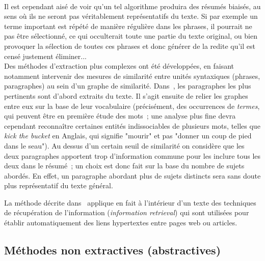 \documentclass[a4paper, 12pt]{article}
\begin{document}
\paragraph{}
Il est cependant aisé de voir qu'un tel algorithme produira des résumés biaisés, au sens où ils ne seront pas véritablement représentatifs du texte. Si par exemple un terme important est répété de manière régulière dans les phrases, il pourrait ne pas être sélectionné, ce qui occulterait toute une partie du texte original, ou bien provoquer la sélection de toutes ces phrases et donc générer de la redite qu'il est censé justement éliminer... \\

Des méthodes d'extraction plus complexes ont été développées, en faisant notamment intervenir des mesures de similarité entre unités syntaxiques (phrases, paragraphes) au sein d'un graphe de similarité. Dans~\cite{salton_automatic_1997}, les paragraphes les plus pertinents sont d'abord extraits du texte. Il s'agit ensuite de relier les graphes entre eux sur la base de leur vocabulaire (précisément, des occurrences de \emph{termes}, qui peuvent être en première étude des mots~; une analyse plus fine devra cependant reconnaître certaines entités indissociables de plusieurs mots, telles que \textit{kick the bucket} en Anglais, qui signifie "mourir" et pas "donner un coup de pied dans le seau"). Au dessus d'un certain seuil de similarité on considère que les deux paragraphes apportent trop d'information commune pour les inclure tous les deux dans le résumé~; un choix est donc fait sur la base du nombre de sujets abordés. En effet, un paragraphe abordant plus de sujets distincts sera sans doute plus représentatif du texte général.

La méthode décrite dans~\cite{salton_automatic_1997} applique en fait à l'intérieur d'un texte des techniques de récupération  de l'information (\emph{information retrieval}) qui sont utilisées pour établir automatiquement des liens hypertextes entre pages web ou articles.


\subsection{Méthodes non extractives (abstractives)}
\end{document}

